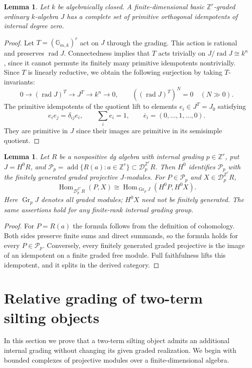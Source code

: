 \documentclass[12pt,a4paper,english,reqno]{amsart}
\theoremstyle{plain}
\newtheorem{lem}[thm]{Lemma}
\theoremstyle{definition}
\numberwithin{equation}{section}
\def\de{\delta}
\def\Hom{\operatorname{Hom}}
\def\rad{\operatorname{rad}}
\def\add{\operatorname{add}}
\def\calD{{\mathcal D}}
\def\bbZ{{\mathbb Z}}
\def\iso{\cong}
\begin{document}
\begin{lem}\label{lem:idempotents}
Let $k$ be algebraically closed. A finite-dimensional basic $\bbZ^r$-graded ordinary $k$-algebra $J$ has a complete set of primitive orthogonal idempotents of internal degree zero.
\end{lem}
\begin{proof}
Let $T=(\mathbb G_{m,k})^r$ act on $J$ through the grading. This action is rational and preserves $\rad J$. Connectedness implies that $T$ acts trivially on $J/\rad J\iso k^n$, since it cannot permute its finitely many primitive idempotents nontrivially. Since $T$ is linearly reductive, we obtain the following surjection by taking $T$-invariants:
\[
 0\longrightarrow(\rad J)^T\longrightarrow J^T
 \longrightarrow k^n\longrightarrow0,
 \qquad ((\rad J)^T)^N=0\quad(N\gg0).
\]
The primitive idempotents of the quotient lift to elements $e_i\in J^T=J_0$ satisfying
\[
 e_ie_j=\de_{ij}e_i,\qquad \sum_i e_i=1,
 \qquad \overline e_i=(0,\ldots,1,\ldots,0).
\] They are primitive in $J$ since their images are primitive in its semisimple quotient.
\end{proof}

\begin{lem}\label{lem:proj}
Let $R$ be a nonpositive dg algebra with internal grading $p\in\bbZ^r$, put $J=H^0R$, and
$\mathcal P_p=\add\{R(a):a\in\bbZ^r\}\subset\calD^{\bbZ^r}_pR$.
Then $H^0$ identifies $\mathcal P_p$ with the finitely generated graded projective $J$-modules. For $P\in\mathcal P_p$ and $X\in\calD^{\bbZ^r}_pR$,
\[
 \Hom_{\calD^{\bbZ^r}_pR}(P,X)
 \iso\Hom_{\operatorname{Gr}_pJ}(H^0P,H^0X).
\]
Here $\operatorname{Gr}_pJ$ denotes all graded modules; $H^0X$ need not be finitely generated. The same assertions hold for any finite-rank internal grading group.
\end{lem}
\begin{proof}
For $P=R(a)$ the formula follows from the definition of cohomology. Both sides preserve finite sums and direct summands, so the formula holds for every $P\in\mathcal P_p$. Conversely, every finitely generated graded projective is the image of an idempotent on a finite graded free module. Full faithfulness lifts this idempotent, and it splits in the derived category.
\end{proof}

\section{Relative grading of two-term silting objects}\label{sec:relative}
In this section we prove that a two-term silting object admits an additional internal grading without changing its given graded realization. We begin with bounded complexes of projective modules over a finite-dimensional algebra.
\end{document}
